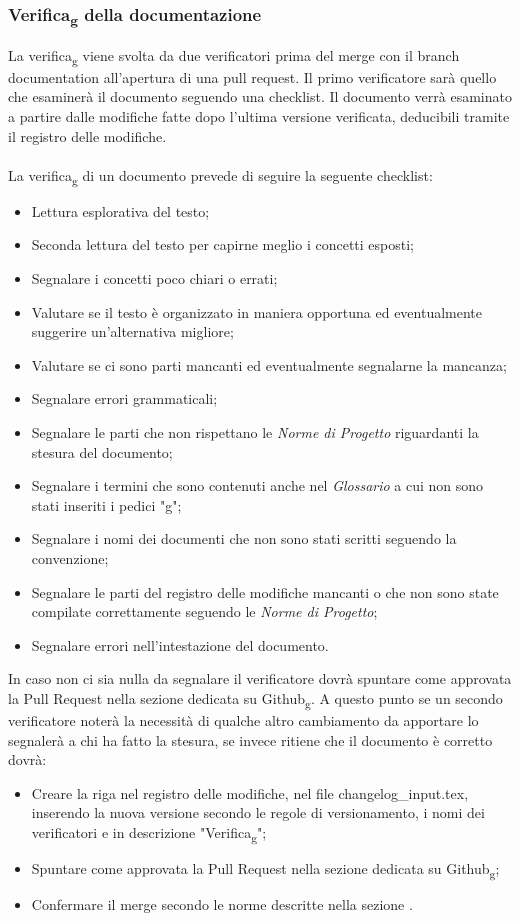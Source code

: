 \subsubsection{Verifica\textsubscript{g} della documentazione}
\label{verifica_documentazione} 
La verifica\textsubscript{g} viene svolta da due verificatori prima del merge con il branch documentation all'apertura di una pull request.
Il primo verificatore sarà quello che esaminerà il documento seguendo una checklist. Il documento verrà esaminato a partire dalle modifiche fatte dopo l'ultima versione verificata, 
deducibili tramite il registro delle modifiche.
\\\\
La verifica\textsubscript{g} di un documento prevede di seguire la seguente checklist:
\begin{itemize}
    \item Lettura esplorativa del testo;
    \item Seconda lettura del testo per capirne meglio i concetti esposti;
    \item Segnalare i concetti poco chiari o errati;
    \item Valutare se il testo è organizzato in maniera opportuna ed eventualmente suggerire un'alternativa migliore;
    \item Valutare se ci sono parti mancanti ed eventualmente segnalarne la mancanza;
    \item Segnalare errori grammaticali;
    \item Segnalare le parti che non rispettano le \textit{Norme di Progetto} riguardanti la stesura del documento;
    \item Segnalare i termini che sono contenuti anche nel \textit{Glossario} a cui non sono stati inseriti i pedici "g";
    \item Segnalare i nomi dei documenti che non sono stati scritti seguendo la convenzione;
    \item Segnalare le parti del registro delle modifiche mancanti o che non sono state compilate correttamente seguendo le \textit{Norme di Progetto};
    \item Segnalare errori nell'intestazione del documento.
\end{itemize}
In caso non ci sia nulla da segnalare il verificatore dovrà spuntare come approvata la Pull Request nella sezione 
dedicata su Github\textsubscript{g}. 
A questo punto se un secondo verificatore noterà la necessità di qualche altro cambiamento da apportare lo segnalerà a 
chi ha fatto la stesura, se invece ritiene che il documento è corretto dovrà:
\begin{itemize}
    \item Creare la riga nel registro delle modifiche, nel file changelog\_input.tex, inserendo la nuova versione secondo le regole di versionamento, i nomi dei verificatori e in descrizione "Verifica\textsubscript{g}";
    \item Spuntare come approvata la Pull Request nella sezione dedicata su Github\textsubscript{g};
    \item Confermare il merge secondo le norme descritte nella sezione .
\end{itemize}